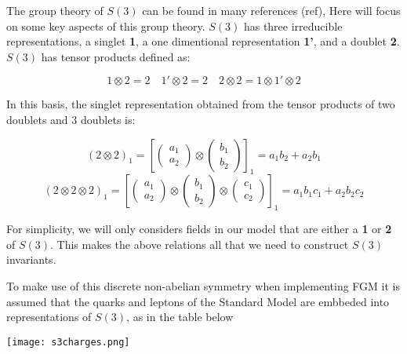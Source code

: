 The group theory of $S(3)$ can be found in many references (ref), Here will focus on some key aspects of this group theory. $S(3)$ has three irreducible representations, a singlet \textbf{1}, a one dimentional representation \textbf{1'}, and a doublet \textbf{2}. $S(3)$ has tensor products defined as:

\begin{equation}
    1 \otimes 2 = 2 \quad 1' \otimes 2 = 2 \quad 2 \otimes 2 = 1 \otimes 1' \otimes 2 
\end{equation}

In this basis, the singlet representation obtained from the tensor products of two doublets and 3 doublets is:

\begin{equation}
    (2 \otimes 2)_1 = [
    \begin{pmatrix}
    a_1\\
    a_2
    \end{pmatrix}
    \otimes 
    \begin{pmatrix}
    b_1\\
    b_2
    \end{pmatrix} ]_1 = a_1b_2 + a_2b_1
\end{equation}
\begin{equation}
    (2 \otimes 2 \otimes 2)_1 = [
    \begin{pmatrix}
    a_1\\
    a_2
    \end{pmatrix}
    \otimes 
    \begin{pmatrix}
    b_1\\
    b_2
    \end{pmatrix}
    \otimes
    \begin{pmatrix}
    c_1\\
    c_2
    \end{pmatrix} ]_1 = a_1b_1c_1 + a_2b_2c_2
\end{equation}

For simplicity, we will only considers fields in our model that are either a \textbf{1} or \textbf{2} of $S(3)$. This makes the above relations all that we need to construct $S(3)$ invariants. 

To make use of this discrete non-abelian symmetry when implementing FGM it is assumed that the quarks and leptons of the Standard Model are embbeded into representations of $S(3)$, as in the table below

\begin{center}
    \texttt{[image: s3charges.png]}
\end{center}

